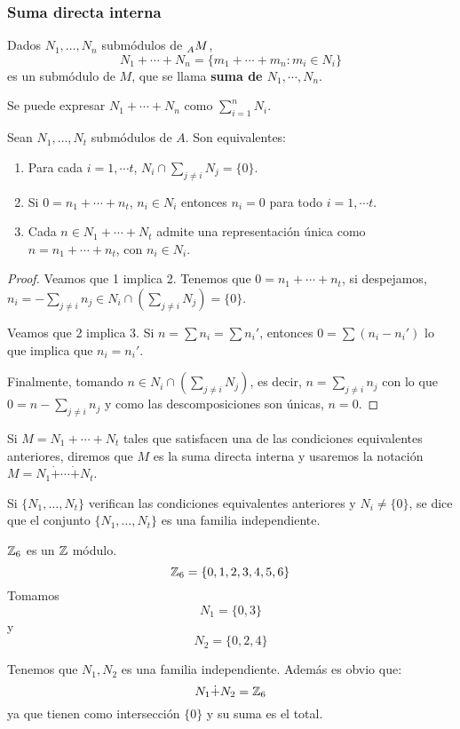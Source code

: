 \subsubsection{Suma directa interna}

\begin{df}
  Dados \(N_1,\ldots, N_n\) submódulos de \(\prescript{}{A}{M}\),
  \[
    N_1+\cdots+ N_n=\{m_1+\cdots+m_n: m_i\in N_i\}
  \]
  es un submódulo de \(M\), que se llama \textbf{suma de \(N_1, \cdots, N_n\)}.
\end{df}

\begin{nt}
  Se puede expresar \(N_1+\cdots+ N_n\) como \(\sum_{i=1}^n N_i\).
\end{nt}

\begin{prop}
  Sean \(N_1,\ldots, N_t\) submódulos de \(A\). Son equivalentes:
  \begin{enumerate}
    \item Para cada \(i = 1, \cdots t\), \(N_i\cap\sum_{j\neq i}N_j =\{0\}\).
    \item Si \(0=n_1+\cdots+n_t\), \(n_i\in N_i\) entonces \(n_i=0\)
      para todo \(i = 1, \cdots t\).
    \item Cada \(n\in N_1+\cdots+N_t\) admite una representación
      única como \(n=n_1+\cdots+n_t\), con \(n_i\in N_i\).
  \end{enumerate}
\end{prop}
\begin{proof}
  Veamos que 1 implica 2. Tenemos que \(0=n_1+\cdots+n_t\),
  si despejamos, \(n_i=-\sum_{j\neq i} n_j\in N_i\cap\left(
  \sum_{j\neq i} N_j\right)=\{0\}\).

  Veamos que 2 implica 3. Si \(n=\sum n_i=\sum n_i'\),
  entonces \(0=\sum(n_i-n_i')\) lo que implica que
  \(n_i=n_i'\).

  Finalmente, tomando \(n\in N_i\cap\left(
  \sum_{j\neq i} N_j\right)\), es decir,
  \(n=\sum_{j\neq i}n_j\) con lo que
  \(0=n-\sum_{j\neq i} n_j\) y como las descomposiciones
  son únicas, \(n=0\).
\end{proof}

\begin{df}
  Si \(M=N_1+\cdots+ N_t\) tales que satisfacen una de las condiciones
  equivalentes anteriores, diremos que \(M\) es la suma directa interna
  y usaremos la notación \(M=N_1\dot{+}\cdots\dot{+} N_t\).
\end{df}

\begin{df}
  Si \(\{N_1,\ldots, N_t\}\) verifican las condiciones equivalentes
  anteriores y \(N_i\neq \{0\}\), se dice que el conjunto
  \(\{N_1,\ldots, N_t\}\) es una
  familia independiente.
\end{df}

\begin{ejemplo}
  \(\mathbb{Z}_6\) es un \(\mathbb{Z}\) módulo.
\[
  \mathbb{Z}_6=\{0,1,2,3,4,5,6\}
\]
Tomamos
\[
  N_1=\{0,3\}
\]
y
\[
  N_2=\{0,2,4\}
\]

Tenemos que \(N_1, N_2\) es una familia independiente. Además es obvio que:
\[
  N_1\dot{+}N_2=\mathbb{Z}_6
\]
ya que tienen como intersección \(\{0\}\) y su suma es el total.
\end{ejemplo}